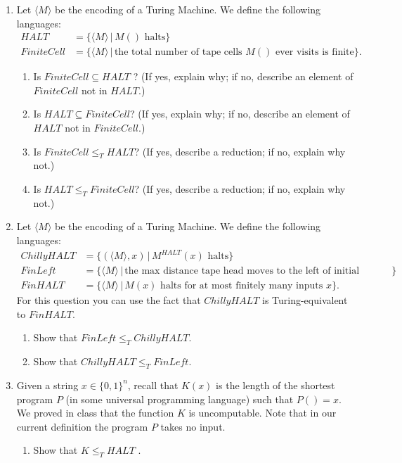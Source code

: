 \documentclass[11pt]{article}
\begin{document}
\begin{enumerate}
\item Let $\langle M \rangle$ be the encoding of a Turing Machine. We define the following languages:
\begin{align*}
HALT &= \{\langle M \rangle \, | \, M() \textrm{ halts} \} \\
FiniteCell &= \{\langle M \rangle \, | \, \textrm{the total number of tape cells $M()$ ever visits is finite} \}.
\end{align*}

\begin{enumerate}
\item Is $FiniteCell \subseteq HALT$ ? (If yes, explain why; if no, describe an element of $FiniteCell$ not in $HALT$.)
\item Is $HALT \subseteq FiniteCell$? (If yes, explain why; if no, describe an element of $HALT$ not in $FiniteCell$.)
\item Is $FiniteCell \leq_T HALT$? (If yes, describe a reduction; if no, explain why not.)
\item Is $HALT \leq_T FiniteCell$? (If yes, describe a reduction; if no, explain why not.)
\end{enumerate}

\item Let $\langle M \rangle$ be the encoding of a Turing Machine. We define the following languages:
\begin{align*}
ChillyHALT &= \{ (\langle M \rangle , x) \, | \, M^{HALT} (x) \textrm{ halts}\} \\
FinLeft &= \{ \langle M \rangle \, | \, \textrm{the max distance tape head moves to the left of initial location is finite} \} \\
FinHALT &= \{\langle M \rangle \, | \, M(x) \textrm{ halts for at most finitely many inputs $x$} \}.
\end{align*}
For this question you can use the fact that $ChillyHALT$ is Turing-equivalent to $FinHALT$.
\begin{enumerate}

\item  Show that $FinLeft \leq_T ChillyHALT$.

\item Show that $ChillyHALT \leq_T FinLeft$.
\end{enumerate}

\item Given a string $x \in \{0, 1\}^n$, recall that $K(x)$ is the length of the shortest
program $P$ (in some universal programming language) such that $P() = x$. We proved in class that
the function $K$ is uncomputable. Note that in our current definition the program $P$ takes no input.
\begin{enumerate}
\item Show that $K \leq_T HALT$ . 


\end{enumerate}
\end{enumerate}
\end{document}
